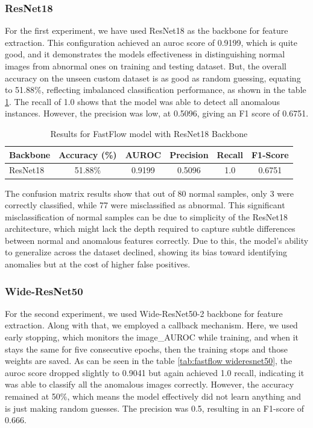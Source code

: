 \subsubsection*{ResNet18}

For the first experiment, we have used ResNet18 as the backbone for feature extraction. This configuration achieved an \gls{auroc} score of 0.9199, which is quite good, and it demonstrates the models effectiveness in distinguishing normal images from abnormal ones on training and testing dataset. But, the overall accuracy on the unseen custom dataset is as good as random guessing, equating to 51.88\%, reflecting imbalanced classification performance, as shown in the table \ref{tab:fastflow resnet18}. The recall of 1.0 shows that the model was able to detect all anomalous instances. However, the precision was low, at 0.5096, giving an F1 score of 0.6751. 

\begin{table}[ht!]
    \centering
    \begin{tabular}{|l|c|c|c|c|c|}
        \hline
        \textbf{Backbone} & \textbf{Accuracy (\%)} & \textbf{AUROC} & \textbf{Precision} & \textbf{Recall} & \textbf{F1-Score} \\ \hline
        ResNet18 & 51.88\% & 0.9199 & 0.5096 & 1.0 & 0.6751 \\ \hline
    \end{tabular}
    \caption{Results for FastFlow model with ResNet18 Backbone}
    \label{tab:fastflow resnet18}
\end{table}

The confusion matrix results show that out of 80 normal samples, only 3 were correctly classified, while 77 were misclassified as abnormal. This significant misclassification of normal samples can be due to simplicity of the ResNet18 architecture, which might lack the depth required to capture subtle differences between normal and anomalous features correctly. Due to this, the model's ability to generalize across the dataset declined, showing its bias toward identifying anomalies but at the cost of higher false positives.

\subsubsection*{Wide-ResNet50}

For the second experiment, we used Wide-ResNet50-2 backbone for feature extraction. Along with that, we employed a callback mechanism. Here, we used early stopping, which monitors the image\_AUROC while training, and when it stays the same for five consecutive epochs, then the training stops and those weights are saved. As can be seen in the table \ref{tab:fastflow wideresnet50}, the \gls{auroc} score dropped slightly to 0.9041 but again achieved 1.0 recall, indicating it was able to classify all the anomalous images correctly. However, the accuracy remained at 50\%, which means the model effectively did not learn anything and is just making random guesses. The precision was 0.5, resulting in an F1-score of 0.666.

